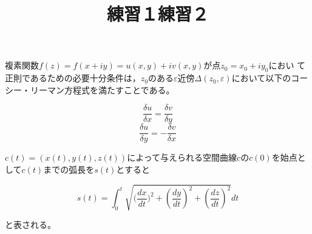 \documentclass[a4]{jsarticle}
\begin{document}
\title{練習１}

複素関数$f(z)=f(x+iy)=u(x,y)+iv(x,y)$が点$z_0=x_0+iy_0$におい
て正則であるための必要十分条件は，$z_0$のある$ε$近傍$Δ(z_0,ε)$において以下のコーシー・リーマン方程式を満たすことである。

\[\frac{\delta u}{\delta x}=\frac{\delta v}{\delta y}\]
\[\frac{\delta u}{\delta y}=-\frac{\delta v}{\delta x}\]


\title{練習２}
$c(t)=(x(t),y(t),z(t))$によって与えられる空間曲線$c$の$c(0)$を始点として$c(t)$までの弧長を$s(t)$とすると

\[s(t)=\int_{0}^{t} \sqrt{\Big(\frac{dx}{dt}\Big)^2 + (\frac{dy}{dt})^2 + (\frac{dz}{dt})^2} dt\]

と表される。
\end{document}
